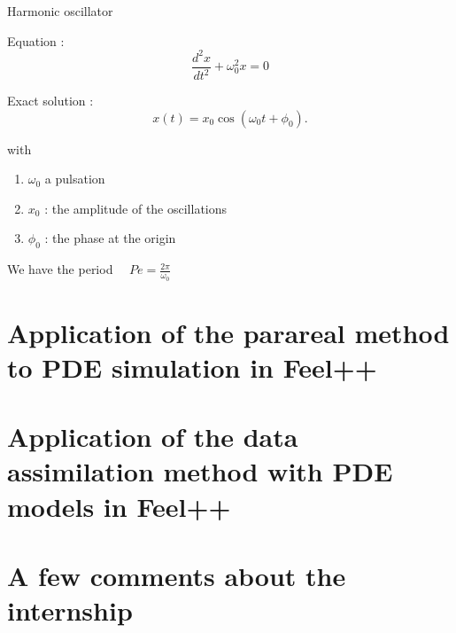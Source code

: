 \documentclass[10pt,xcolor={table,dvipsnames},t]{beamer}
\begin{document}
	\begin{frame}{Harmonic oscillator}
		\begin{minipage}{0.48\linewidth}
			Equation :
			$$\frac{d^2 x}{d t^2}+\omega_0^2 x = 0$$
		\end{minipage}
		\begin{minipage}{0.48\linewidth}
			Exact solution :
			$$x(t) = x_0 \cos(\omega_{0}t+\phi_0).$$ 
		\end{minipage}	
		with
		\begin{enumerate}[\textbullet]
			\item $\omega_0$ a pulsation
			\item $x_0$ : the amplitude of the oscillations
			\item $\phi_0$ : the phase at the origin
		\end{enumerate}
		We have the period $\quad Pe=\frac{2\pi}{\omega_0}$		
	\end{frame}

	\section{Application of the parareal method to PDE simulation in Feel++}

	
	
	\section{Application of the data assimilation method with PDE models in Feel++}
	
	
	
	\section{A few comments about the internship}
	
\end{document}
